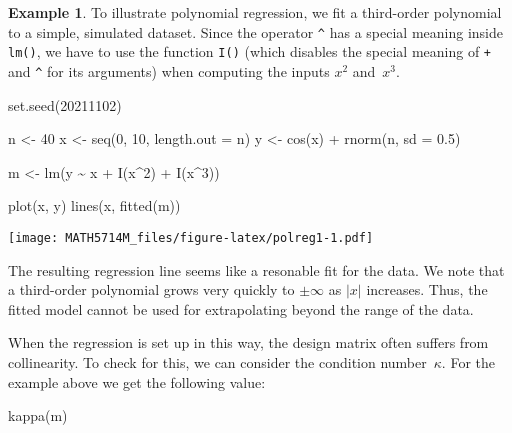 \documentclass[
  a4paper,
]{article}
\newenvironment{Shaded}{\begin{snugshade}}{\end{snugshade}}
\newcommand{\AttributeTok}[1]{\textcolor[rgb]{0.77,0.63,0.00}{#1}}
\newcommand{\DecValTok}[1]{\textcolor[rgb]{0.00,0.00,0.81}{#1}}
\newcommand{\FloatTok}[1]{\textcolor[rgb]{0.00,0.00,0.81}{#1}}
\newcommand{\FunctionTok}[1]{\textcolor[rgb]{0.00,0.00,0.00}{#1}}
\newcommand{\NormalTok}[1]{#1}
\newcommand{\OtherTok}[1]{\textcolor[rgb]{0.56,0.35,0.01}{#1}}
\newcommand{\SpecialCharTok}[1]{\textcolor[rgb]{0.00,0.00,0.00}{#1}}
\theoremstyle{definition}
\theoremstyle{definition}
\newtheorem{example}{Example}[section]
\theoremstyle{definition}
\theoremstyle{definition}
\theoremstyle{remark}
\begin{document}
\begin{example}
To illustrate polynomial regression, we fit a third-order polynomial
to a simple, simulated dataset. Since the operator \texttt{\^{}} has a special
meaning inside \texttt{lm()}, we have to use the function \texttt{I()} (which disables
the special meaning of \texttt{+} and \texttt{\^{}} for its arguments) when computing
the inputs \(x^2\) and~\(x^3\).

\begin{Shaded}
\begin{Highlighting}[]
\FunctionTok{set.seed}\NormalTok{(}\DecValTok{20211102}\NormalTok{)}

\NormalTok{n }\OtherTok{\textless{}{-}} \DecValTok{40}
\NormalTok{x }\OtherTok{\textless{}{-}} \FunctionTok{seq}\NormalTok{(}\DecValTok{0}\NormalTok{, }\DecValTok{10}\NormalTok{, }\AttributeTok{length.out =}\NormalTok{ n)}
\NormalTok{y }\OtherTok{\textless{}{-}} \FunctionTok{cos}\NormalTok{(x) }\SpecialCharTok{+} \FunctionTok{rnorm}\NormalTok{(n, }\AttributeTok{sd =} \FloatTok{0.5}\NormalTok{)}

\NormalTok{m }\OtherTok{\textless{}{-}} \FunctionTok{lm}\NormalTok{(y }\SpecialCharTok{\textasciitilde{}}\NormalTok{ x }\SpecialCharTok{+} \FunctionTok{I}\NormalTok{(x}\SpecialCharTok{\^{}}\DecValTok{2}\NormalTok{) }\SpecialCharTok{+} \FunctionTok{I}\NormalTok{(x}\SpecialCharTok{\^{}}\DecValTok{3}\NormalTok{))}

\FunctionTok{plot}\NormalTok{(x, y)}
\FunctionTok{lines}\NormalTok{(x, }\FunctionTok{fitted}\NormalTok{(m))}
\end{Highlighting}
\end{Shaded}

\texttt{[image: MATH5714M\_files/figure-latex/polreg1-1.pdf]}

The resulting regression line seems like a resonable fit for the data.
We note that a third-order polynomial grows very quickly to \(\pm\infty\)
as \(|x|\) increases. Thus, the fitted model cannot be used for extrapolating
beyond the range of the data.
\end{example}

When the regression is set up in this way, the design matrix often suffers
from collinearity. To check for this, we can consider the condition
number~\(\kappa\). For the example above we get the following value:

\begin{Shaded}
\begin{Highlighting}[]
\FunctionTok{kappa}\NormalTok{(m)}
\end{Highlighting}
\end{Shaded}
\end{document}
